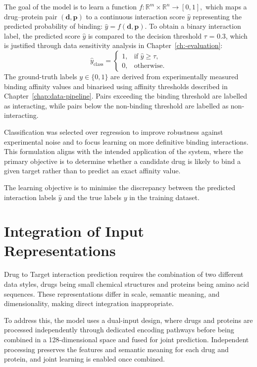The goal of the model is to learn a function $f: \mathbb{R}^{m} \times \mathbb{R}^{n} \rightarrow [0,1],$ which maps a drug--protein pair $(\mathbf{d}, \mathbf{p})$ to a continuous interaction score $\hat{y}$ representing the predicted probability of binding:
$\hat{y} = f(\mathbf{d}, \mathbf{p}).$
To obtain a binary interaction label, the predicted score $\hat{y}$ is compared to the decision threshold $\tau$ = 0.3, which is justified through data sensitivity analysis in Chapter~\ref{ch:-evaluation}:
\[
\hat{y}_{\text{class}} =
\begin{cases}
1, & \text{if } \hat{y} \ge \tau, \\
0, & \text{otherwise}.
\end{cases}
\]
The ground-truth labels $y \in \{0,1\}$ are derived from experimentally measured binding affinity values and binarised using affinity thresholds described in Chapter~\ref{chap:data-pipeline}.
Pairs exceeding the binding threshold are labelled as interacting, while pairs below the non-binding threshold are labelled as non-interacting.

Classification was selected over regression to improve robustness against experimental noise and to focus learning on more definitive binding interactions.
This formulation aligns with the intended application of the system, where the primary objective is to determine whether a candidate drug is likely to bind a given target rather than to predict an exact affinity value.

The learning objective is to minimise the discrepancy between the predicted interaction labels $\hat{y}$ and the true labels $y$ in the training dataset.

\section{Integration of Input Representations}
Drug to Target interaction prediction requires the combination of two different data styles, drugs being small chemical structures and proteins being amino acid sequences.
These representations differ in scale, semantic meaning, and dimensionality, making direct integration inappropriate.

To address this, the model uses a dual-input design, where drugs and proteins are processed independently through dedicated encoding pathways before being combined in a 128-dimensional space and fused for joint prediction.
Independent processing preserves the features and semantic meaning for each drug and protein, and joint learning is enabled once combined.
